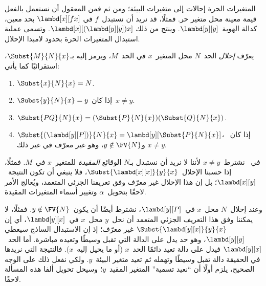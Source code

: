 \documentclass[../../../include/open-logic-section]{subfiles}
\begin{document}

\begin{explain}
المتغيرات الحرة إحالات إلى متغيرات البيئة؛ ومن ثم فمن المعقول أن نستعمل
بالفعل قيمة معينة محل متغير حر. فمثلًا، قد نريد أن نستبدل~$f$ في
$\lambd[x][f x]$ بحد معين، كدالة الهوية~$\lambd[y][y]$. وينتج من ذلك
$\lambd[x][(\lambd[y][y]) x]$. وتسمى عملية استبدال المتغيرات الحرة بحدود
لامبدا الإحلال.
\end{explain}

\begin{defn}[الإحلال] 
  يعرّف \emph{إحلال} الحد~$N$ محل المتغير~$x$ في الحد~$M$، ويرمز إليه
  بـ$\Subst{M}{N}{x}$، استقرائيًا كما يأتي:
  \begin{enumerate}
    \item $\Subst{x}{N}{x} = N$.  
    \item $\Subst{y}{N}{x}  = y$ إذا كان~$x \neq y$.  
    \item $\Subst{PQ}{N}{x}  = (\Subst{P}{N}{x}) (\Subst{Q}{N}{x})$.
    \item $\Subst{(\lambd[y][P])}{N}{x} = \lambd[y][\Subst{P}{N}{x}]$،
      إذا كان~$x \neq y$ و$y \notin \FV{N}$، وهو غير معرّف في غير ذلك.
  \end{enumerate}
\end{defn}

\begin{explain}
في~ نشترط~$x
\neq y$ لأننا لا نريد أن نستبدل بـ$N$ الوقائع \emph{المقيدة} للمتغير~$x$
في~$M$. فمثلًا، إذا حسبنا الإحلال~$\Subst{\lambd[x][x]}{y}{x}$، فلا
ينبغي أن تكون النتيجة~$\lambd[x][y]$؛ بل إن هذا الإحلال غير معرّف وفق
تعريفنا الجزئي المتعمد، ويُعالج الأمر لاحقًا بتحويل~$\alpha$ وتغيير أسماء
المتغيرات المقيدة.

وعند إحلال~$N$ محل~$x$ في~$\lambd[y][P]$، نشترط أيضًا أن يكون~$y
\notin \FV{N}$. فمثلًا، لا يمكننا وفق هذا التعريف الجزئي المتعمد أن
نحل~$y$ محل~$x$ في~$\lambd[y][x]$، أي إن
$\Subst{\lambd[y][x]}{y}{x}$ غير معرّف؛ إذ إن الاستبدال الساذج سيعطي
$\lambd[y][y]$، وهو حد يدل على الدالة التي تقبل وسيطًا وتعيده مباشرة.
أما الحد~$\lambd[y][x]$ فيدل على دالة تعيد دائمًا الحد~$x$ (أو ما يحيل
إليه~$x$). فالنتيجة التي نريدها في الحقيقة دالة تقبل وسيطًا وتهمله ثم
تعيد متغير البيئة~$y$. ولكي نفعل ذلك على الوجه الصحيح، يلزم أولًا أن
``نعيد تسمية'' المتغير المقيد~$y$؛ وسيحل تحويل ألفا هذه المسألة لاحقًا.
\end{explain}
\end{document}
